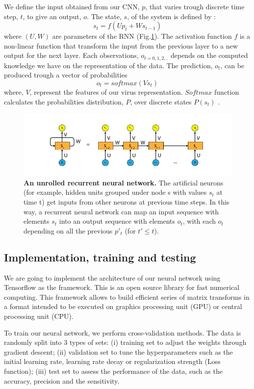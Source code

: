 \documentclass[12pt]{article}
\begin{document}
We define the input obtained from our CNN, $p$, that varies trough discrete time step, $t$, to give an output, $o$. The state, $s$, of the system is defined by :
$$s_t = f(Up_t+ Ws_{t-1})$$ where $(U,W)$ are parameters of the RNN (Fig.\ref{fig:RNN}). The activation function $f$ is a non-linear function that transform the input from the previous layer to a new output for the next layer. Each observations, $o_{t=0,1,2 ... }$ depends on the computed knowledge we have on the representation of the data. The prediction, $o_t$, can be produced trough a vector of probabilities  $$o_t=softmax(Vs_t)$$ where, $V$, represent the features of our virus representation. $Softmax$ function calculates the probabilities distribution, $P$, over discrete states $P(s_t)$ .

\begin{figure}[h]
    \centering
    \includegraphics[width=\textwidth]{figure-3.png}
    \caption{ \textbf{An unrolled recurrent neural network.} The artificial neurons (for example, hidden units grouped under node s with values $s_t$ at time t) get inputs from other neurons at previous time steps. In this way, a recurrent neural network can map an input sequence with elements $s_t$ into an output sequence with elements $o_t$, with each $o_t$ depending on all the previous $p'_t$ (for $t'\leq t$). }
    \label{fig:RNN}
\end{figure}

\subsection{Implementation, training and testing}

We are going to implement the architecture of our neural network using Tensorflow\autocite{abadi2016} as the framework. This is an open source library for fast numerical computing. This framework allows to build efficient series of matrix transforms in a format intended to be executed on graphics processing unit (GPU) or central processing unit (CPU). 

To train our neural network, we perform cross-validation methods. The data is randomly split into 3 types of sets: (i) training set to adjust the weights through gradient descent; (ii) validation set to tune the hyperparameters such as the initial learning rate, learning rate decay or regularization strength (Loss function); (iii) test set to assess the performance of the data, such as the accuracy, precision and the sensitivity. 
\end{document}
